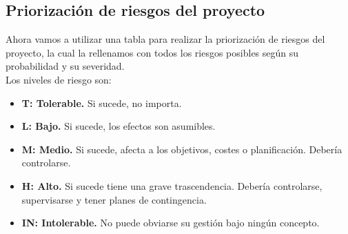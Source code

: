 \subsection{Priorización de riesgos del proyecto}
Ahora vamos a utilizar una tabla para realizar la priorización de riesgos del proyecto, la cual la rellenamos con todos los riesgos posibles según su probabilidad y su severidad.\\
Los niveles de riesgo son:
\begin{itemize}
	\item \textbf{T: Tolerable.} Si sucede, no importa.
	\item\textbf{L: Bajo.} Si sucede, los efectos son asumibles.
	\item\textbf{M: Medio.} Si sucede, afecta a los objetivos, costes o planificación. Debería controlarse.
	\item\textbf{H: Alto.} Si sucede tiene una grave trascendencia. Debería controlarse, supervisarse y tener planes de contingencia.
	\item\textbf{IN: Intolerable.} No puede obviarse su gestión bajo ningún concepto.

\end{itemize}

